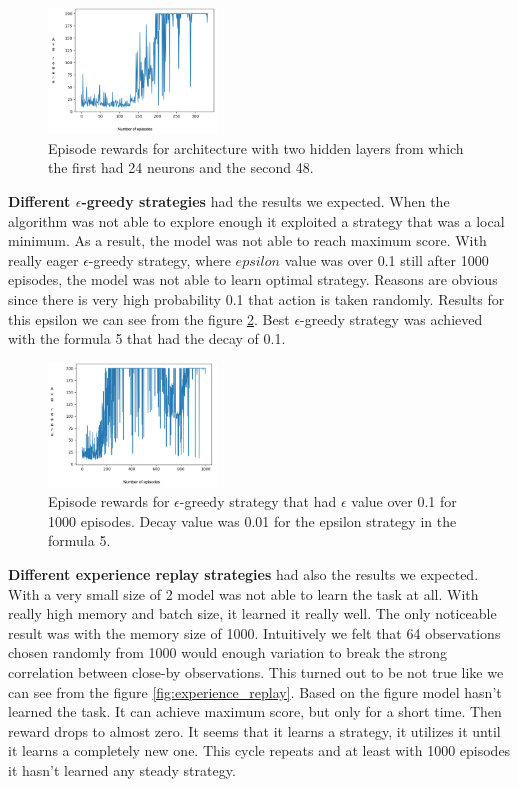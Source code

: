 \begin{figure}[H]
    \centering
    \includegraphics[width=0.4\textwidth]{images/nn_24_48.png}
    \caption{
    Episode rewards for architecture with two hidden layers from which the first had 24 neurons and the second 48.
    }
    \label{fig:nn_24_48}
\end{figure}

\textbf{Different $\epsilon$-greedy strategies} had the results we expected. When the algorithm was not able to explore enough it exploited a strategy that was a local minimum. As a result, the model was not able to reach maximum score.
With really eager $\epsilon$-greedy strategy, where $epsilon$ value was over 0.1 still after 1000 episodes, the model was not able to learn optimal strategy. Reasons are obvious since there is very high probability 0.1 that action is taken randomly. Results for this epsilon we can see from the figure \ref{fig:e-greedy}.
Best $\epsilon$-greedy strategy was achieved with the formula 5 that had the decay of 0.1.

\begin{figure}[H]
    \centering
    \includegraphics[width=0.4\textwidth]{images/e-greedy.png}
    \caption{
    Episode rewards for $\epsilon$-greedy strategy that had $\epsilon$ value over 0.1 for 1000 episodes. Decay value was 0.01 for the epsilon strategy in the formula 5.
    }
    \label{fig:e-greedy}
\end{figure}

\textbf{Different experience replay strategies} had also the results we expected. With a very small size of 2 model was not able to learn the task at all. With really high memory and batch size, it learned it really well. The only noticeable result was with the memory size of 1000. Intuitively we felt that 64 observations chosen randomly from 1000 would enough variation to break the strong correlation between close-by observations. This turned out to be not true like we can see from the figure \ref{fig:experience_replay}. Based on the figure model hasn't learned the task. It can achieve maximum score, but only for a short time. Then reward drops to almost zero. It seems that it learns a strategy, it utilizes it until it learns a completely new one. This cycle repeats and at least with 1000 episodes it hasn't learned any steady strategy.

